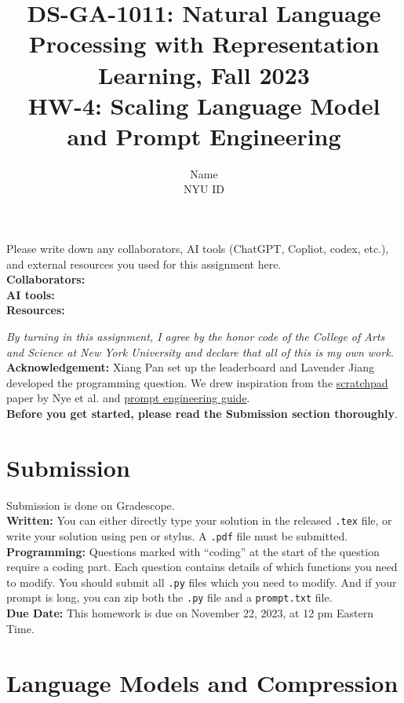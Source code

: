 \documentclass{article}
\title{\textbf{DS-GA-1011: Natural Language Processing with Representation Learning, Fall 2023} \\HW-4: Scaling Language Model and Prompt Engineering}
\author{Name \\
NYU ID}
\date{}
\theoremstyle{case}
\theoremstyle{definition}
\begin{document}
\maketitle

\begin{tcolorbox}
Please write down any collaborators, AI tools (ChatGPT, Copliot, codex, etc.), and external resources you used for this assignment here. \\
\textbf{Collaborators:} \\
\textbf{AI tools:} \\
\textbf{Resources:}
\end{tcolorbox}
\textit{By turning in this assignment, I agree by the honor code of the College of Arts and Science at New York University and declare
that all of this is my own work.} \\

\textbf{Acknowledgement:} Xiang Pan set up the leaderboard and Lavender Jiang developed the programming question. We drew inspiration from the \href{https://arxiv.org/abs/2112.00114}{scratchpad} paper by Nye et al. and \href{https://www.promptingguide.ai/}{prompt engineering guide}. \\


\textbf{Before you get started, please read the Submission section thoroughly}.

\section*{Submission}
Submission is done on Gradescope. \\

\textbf{Written:} You can either directly type your solution in the released \texttt{.tex} file,
or write your solution using pen or stylus.
A \texttt{.pdf} file must be submitted.\\

\textbf{Programming:} Questions marked with ``coding'' at the start of the question require a coding part. Each question contains details of which functions you need to modify. You should submit all \texttt{.py} files which you need to modify. And if your prompt is long, you can zip both the \texttt{.py} file and a  \texttt{prompt.txt} file.\\

\textbf{Due Date:} This homework is due on November 22, 2023, at 12 pm Eastern Time.

\section*{Language Models and Compression}
\end{document}
